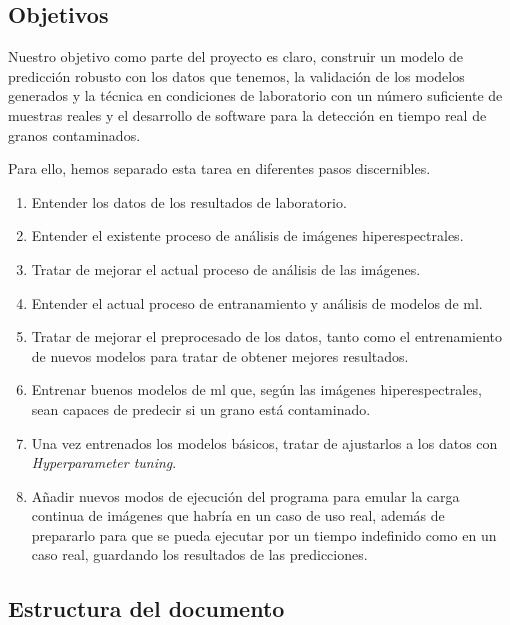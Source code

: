 \subsection{Objetivos}

Nuestro objetivo como parte del proyecto es claro, construir un modelo de predicción robusto con los datos que tenemos, la validación de los modelos generados y la técnica en
condiciones de laboratorio con un número suficiente de muestras reales y el desarrollo de software para la detección en tiempo real de granos contaminados. 

Para ello, hemos separado esta tarea en diferentes pasos discernibles. 

\begin{enumerate}
    \item Entender los datos de los resultados de laboratorio.
    \item Entender el existente proceso de análisis de imágenes hiperespectrales.
    \item Tratar de mejorar el actual proceso de análisis de las imágenes.
    \item Entender el actual proceso de entranamiento y análisis de modelos de \gls{ml}.
    \item Tratar de mejorar el preprocesado de los datos, tanto como el entrenamiento de nuevos modelos para tratar de obtener mejores resultados.
    \item Entrenar buenos modelos de \gls{ml} que, según las imágenes hiperespectrales, sean capaces de predecir si un grano está contaminado. 
    \item Una vez entrenados los modelos básicos, tratar de ajustarlos a los datos con \textit{Hyperparameter tuning}.
    \item Añadir nuevos modos de ejecución del programa para emular la carga continua de imágenes que habría en un caso de uso real, además de prepararlo para que se 
    pueda ejecutar por un tiempo indefinido como en un caso real, guardando los resultados de las predicciones.
\end{enumerate}

\subsection{Estructura del documento}

